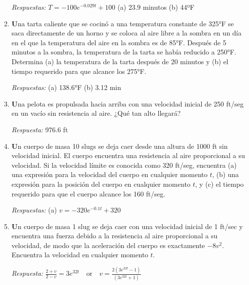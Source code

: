 \documentclass[a4paper,12pt]{article}
\begin{document}
\begin{enumerate}
\textit{Respuestas:}  
\(T = -100e^{-0.029t} + 100\)  
(a) 23.9 minutos
(b) 44ºF
    \item \textbf Una tarta caliente que se cocinó a una temperatura constante de 325°F se saca directamente de un horno y se coloca al aire libre a la sombra en un día en el que la temperatura del aire en la sombra es de 85°F. Después de 5 minutos a la sombra, la temperatura de la tarta se había reducido a 250°F. Determina (a) la temperatura de la tarta después de 20 minutos y (b) el tiempo requerido para que alcance los 275°F.

\textit{Respuestas:}  
(a) 138.6°F  
(b) 3.12 min
    \item \textbf Una pelota es propulsada hacia arriba con una velocidad inicial de 250 ft/seg en un vacío sin resistencia al aire. ¿Qué tan alto llegará?

\textit{Respuesta:}  
976.6 ft
    \item \textbf  Un cuerpo de masa 10 slugs se deja caer desde una altura de 1000 ft sin velocidad inicial. El cuerpo encuentra una resistencia al aire proporcional a su velocidad. Si la velocidad límite es conocida como 320 ft/seg, encuentra (a) una expresión para la velocidad del cuerpo en cualquier momento \(t\), (b) una expresión para la posición del cuerpo en cualquier momento \(t\), y (c) el tiempo requerido para que el cuerpo alcance los 160 ft/seg.

\textit{Respuestas:}  
(a) \(v = -320e^{-0.1t} + 320\)  
    \item \textbf Un cuerpo de masa 1 slug se deja caer con una velocidad inicial de 1 ft/sec y encuentra una fuerza debido a la resistencia al aire proporcional a su velocidad, de modo que la aceleración del cuerpo es exactamente \( -8v^2 \). Encuentra la velocidad en cualquier momento \(t\).

\textit{Respuesta:}  
\( \frac{2 + v}{2 - v} = 3e^{32t} \quad \text{or} \quad v = \frac{2(3e^{32t} - 1)}{(3e^{32t} + 1)} \)

\end{enumerate}
\end{document}
